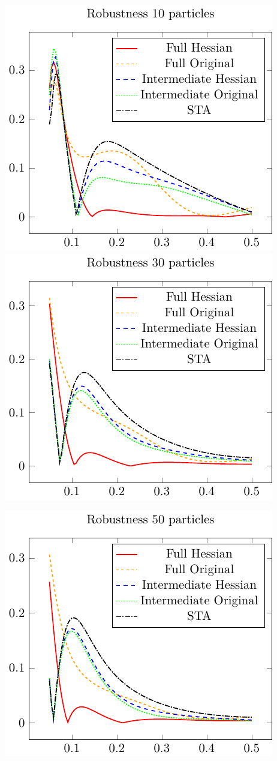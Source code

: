 \documentclass{article}
\begin{document}
\includegraphics{./gfx/robustness_np10_nlambda5.pdf}
\includegraphics{./gfx/robustness_np30_nlambda5.pdf}

\begin{center}
	\includegraphics{./gfx/robustness_np50_nlambda5.pdf}
\end{center}
\end{document}
